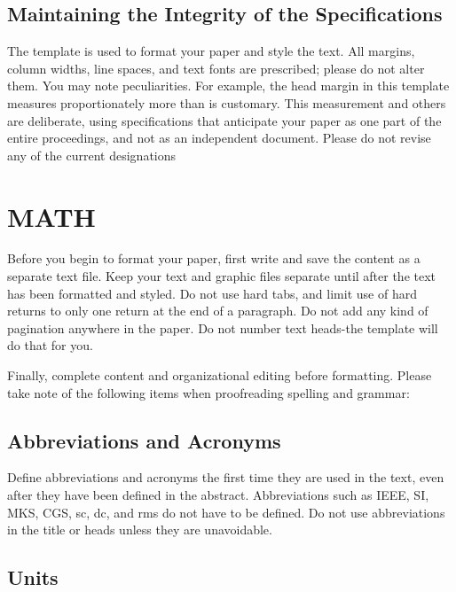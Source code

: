 \documentclass[letterpaper, 10 pt, conference]{ieeeconf}  %
\begin{document}
\subsection{Maintaining the Integrity of the Specifications}

The template is used to format your paper and style the text. All margins, column widths, line spaces, and text fonts are prescribed; please do not alter them. You may note peculiarities. For example, the head margin in this template measures proportionately more than is customary. This measurement and others are deliberate, using specifications that anticipate your paper as one part of the entire proceedings, and not as an independent document. Please do not revise any of the current designations

\section{MATH}

Before you begin to format your paper, first write and save the content as a separate text file. Keep your text and graphic files separate until after the text has been formatted and styled. Do not use hard tabs, and limit use of hard returns to only one return at the end of a paragraph. Do not add any kind of pagination anywhere in the paper. Do not number text heads-the template will do that for you.

Finally, complete content and organizational editing before formatting. Please take note of the following items when proofreading spelling and grammar:

\subsection{Abbreviations and Acronyms} Define abbreviations and acronyms the first time they are used in the text, even after they have been defined in the abstract. Abbreviations such as IEEE, SI, MKS, CGS, sc, dc, and rms do not have to be defined. Do not use abbreviations in the title or heads unless they are unavoidable.

\subsection{Units}
\end{document}
